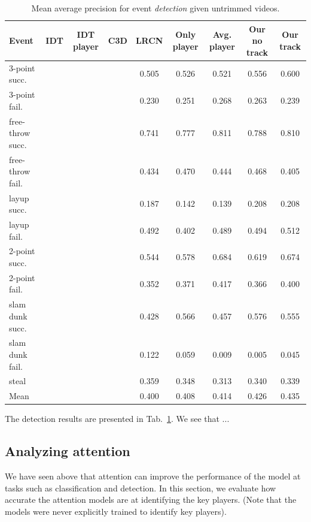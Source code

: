 \begin{table}[ht!]
\begin{center}
\small
 \begin{tabular}{|l|c|c|c|c|c|c|c|c|}
  \hline
Event & IDT\cite{Wang_CVPR11} & IDT player\cite{Wang_CVPR11} & C3D \cite{Tran_arxiv14} & LRCN \cite{Donahue_arxiv14} & Only player & Avg. player & Our no track & Our track \\ \hline \hline
3-point succ.    &  &  &  & 0.505 & 0.526 & 0.521 & 0.556 & 0.600 \\
3-point fail.    &  &  &  & 0.230 & 0.251 & 0.268 & 0.263 & 0.239 \\
free-throw succ. &  &  &  & 0.741 & 0.777 & 0.811 & 0.788 & 0.810 \\
free-throw fail. &  &  &  & 0.434 & 0.470 & 0.444 & 0.468 & 0.405 \\
layup succ.      &  &  &  & 0.187 & 0.142 & 0.139 & 0.208 & 0.208 \\
layup fail.      &  &  &  & 0.492 & 0.402 & 0.489 & 0.494 & 0.512 \\
2-point succ.    &  &  &  & 0.544 & 0.578 & 0.684 & 0.619 & 0.674 \\
2-point fail.    &  &  &  & 0.352 & 0.371 & 0.417 & 0.366 & 0.400 \\
slam dunk succ.  &  &  &  & 0.428 & 0.566 & 0.457 & 0.576 & 0.555 \\
slam dunk fail.  &  &  &  & 0.122 & 0.059 & 0.009 & 0.005 & 0.045 \\
steal            &  &  &  & 0.359 & 0.348 & 0.313 & 0.340 & 0.339 \\ \hline \hline
Mean             &  &  &  & 0.400 & 0.408 & 0.414 & 0.426 & 0.435 \\ \hline
  \end{tabular}
\end{center}
  \caption{Mean average precision for event {\em detection} given
    untrimmed videos.}
  \label{tab:detection_res}
\end{table}

 The detection results
are presented in Tab.~\ref{tab:detection_res}.
We see that  ...


\subsection{Analyzing attention}

We have seen above that attention can improve the performance of the model at tasks such as classification and detection.
In this section, we evaluate how accurate the attention models are at
identifying the key players. (Note that the models were never
explicitly trained to identify key players).

